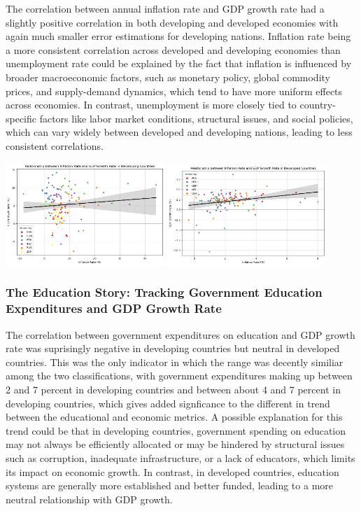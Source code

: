 \documentclass[
  letterpaper,
  DIV=11,
  numbers=noendperiod]{scrartcl}
\begin{document}
The correlation between annual inflation rate and GDP growth rate had a
slightly positive correlation in both developing and developed economies
with again much smaller error estimations for developing nations.
Inflation rate being a more consistent correlation across developed and
developing economies than unemployment rate could be explained by the
fact that inflation is influenced by broader macroeconomic factors, such
as monetary policy, global commodity prices, and supply-demand dynamics,
which tend to have more uniform effects across economies. In contrast,
unemployment is more closely tied to country-specific factors like labor
market conditions, structural issues, and social policies, which can
vary widely between developed and developing nations, leading to less
consistent correlations.

\includegraphics[width=0.45\textwidth,height=\textheight]{figures/Relationship_InflationRate_GDPGrowthRate_DevelopingCountries.png}
\includegraphics[width=0.45\textwidth,height=\textheight]{figures/Relationship_InflationRate_GDPGrowthRate_DevelopedCountries.png}

\subsubsection{The Education Story: Tracking Government Education
Expenditures and GDP Growth
Rate}\label{the-education-story-tracking-government-education-expenditures-and-gdp-growth-rate}

The correlation between government expenditures on education and GDP
growth rate was suprisingly negative in developing countries but neutral
in developed countries. This was the only indicator in which the range
was decently similiar among the two classifications, with government
expenditures making up between 2 and 7 percent in developing countries
and between about 4 and 7 percent in developing countries, which gives
added signficance to the different in trend between the educational and
economic metrics. A possible explanation for this trend could be that in
developing countries, government spending on education may not always be
efficiently allocated or may be hindered by structural issues such as
corruption, inadequate infrastructure, or a lack of educators, which
limits its impact on economic growth. In contrast, in developed
countries, education systems are generally more established and better
funded, leading to a more neutral relationship with GDP growth.
\end{document}
